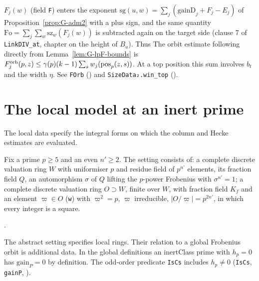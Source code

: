 \begin{remark}[Role of $F$]\label{rem:G-F}
$F_j(w)$ (field \texttt{F}) enters the exponent $\mathrm{sg}(u,w)=\sum_j(\mathrm{gainD}_j+F_j-E_j)$ of
Proposition~\ref{prop:G-adm2} with a plus sign, and the same quantity $\mathrm{Fo}=\sum_j\sum_w \mathrm{sz}_w(F_j(w))$ is
subtracted again on the target side (clause 7 of \texttt{LinkDIV\_at}, chapter on the height of $B_u$). Thus
The orbit estimate following directly from Lemma~\ref{lem:G-lpF-bounds} is
$F^{\rm orb}_j(p,z)\le\gamma(p)(k-1)\sum_s w_j(\mathrm{pos}_p(z,s))$.
At a top position this sum involves $b_t$ and the width $\eta$. See \texttt{FOrb}
() and \texttt{SizeData₂.win\_top}
().
\end{remark}

\section{The local model at an inert prime}\label{sec:G-model}

The local data specify the integral forms on which the column and Hecke estimates are evaluated.

\begin{definition}\label{def:G-setting}
Fix a prime $p\ge 5$ and an even $n'\ge 2$. The setting consists of: a complete discrete valuation ring $W$ with
uniformiser $p$ and residue field of $p^{n'}$ elements, its fraction field $Q$, an automorphism $\sigma$ of $Q$
lifting the $p$-power Frobenius with $\sigma^{n'}=1$; a complete discrete valuation ring $O\supset W$, finite
over $W$, with fraction field $K_f$ and an element $\varpi\in O$ (\texttt{w}) with $\varpi^{2}=p$, $\varpi$
irreducible, $|O/\varpi|=p^{2n'}$, in which every integer is a square.
\par{\small {}.}\par
\end{definition}

The abstract setting specifies local rings. Their relation to a global Frobenius orbit is additional data.
In the global definitions an inertClass prime with $h_p=0$ has $\mathrm{gain}_P=0$ by definition.
The odd-order predicate \texttt{IsCs} includes $h_p\ne0$ (\texttt{IsCs}, \texttt{gainP}, ).

